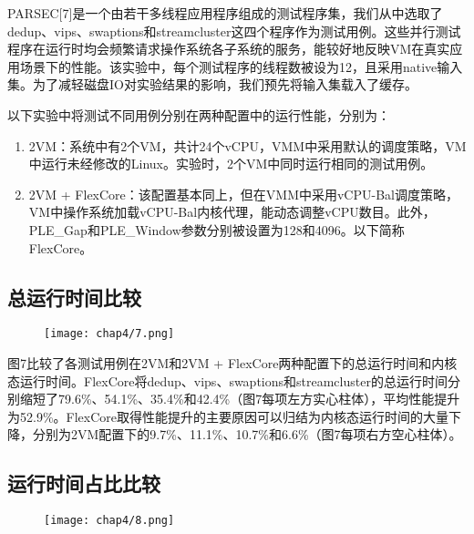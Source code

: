 PARSEC[7]是一个由若干多线程应用程序组成的测试程序集，我们从中选取了dedup、vips、swaptions和streamcluster这四个程序作为测试用例。这些并行测试程序在运行时均会频繁请求操作系统各子系统的服务，能较好地反映VM在真实应用场景下的性能。该实验中，每个测试程序的线程数被设为12，且采用native输入集。为了减轻磁盘IO对实验结果的影响，我们预先将输入集载入了缓存。

以下实验中将测试不同用例分别在两种配置中的运行性能，分别为：

\begin{enumerate}
\item 2VM：系统中有2个VM，共计24个vCPU，VMM中采用默认的调度策略，VM中运行未经修改的Linux。实验时，2个VM中同时运行相同的测试用例。
\item 2VM + FlexCore：该配置基本同上，但在VMM中采用vCPU-Bal调度策略，VM中操作系统加载vCPU-Bal内核代理，能动态调整vCPU数目。此外，PLE\_Gap和PLE\_Window参数分别被设置为128和4096。以下简称FlexCore。
\end{enumerate}


\subsection{总运行时间比较}

\begin{figure}[!htp]
  \centering
  \texttt{[image: chap4/7.png]}
\end{figure}

图7比较了各测试用例在2VM和2VM + FlexCore两种配置下的总运行时间和内核态运行时间。FlexCore将dedup、vips、swaptions和streamcluster的总运行时间分别缩短了79.6\%、54.1\%、35.4\%和42.4\%（图7每项左方实心柱体），平均性能提升为52.9\%。FlexCore取得性能提升的主要原因可以归结为内核态运行时间的大量下降，分别为2VM配置下的9.7\%、11.1\%、10.7\%和6.6\%（图7每项右方空心柱体）。

\subsection{运行时间占比比较}

\begin{figure}[!htp]
  \centering
  \texttt{[image: chap4/8.png]}
\end{figure}

